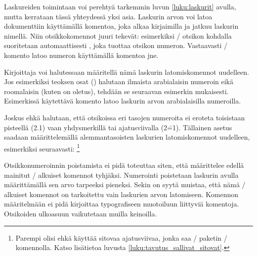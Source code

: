 Laskureiden toimintaan voi perehtyä tarkemmin luvun \ref{luku:laskurit}
avulla, mutta kerrataan tässä yhteydessä yksi asia. Laskurin arvon voi
latoa dokumenttiin käyttämällä komentoa, joka alkaa kirjaimilla
 ja jatkuu laskurin nimellä. Niin otsikkokomennot juuri
tekevät: esimerkiksi \-/ otsikon kohdalla suoritetaan
automaattisesti , joka tuottaa otsikon numeron.
Vastaavasti \-/ komento latoo numeron käyttämällä
komentoa  jne.

Kirjoittaja voi halutessaan määritellä nämä laskurin latomiskomennot
uudelleen. Jos esimerkiksi teoksen osat () halutaan
ilmaista arabialaisin numeroin eikä roomalaisin (kuten on oletus),
tehdään se seuraavan esimerkin mukaisesti. Esimerkissä käytettävä
komento  latoo laskurin arvon arabialaisilla numeroilla.

\begin{koodilohkosis}
\renewcommand{\thepart}{\arabic{part}}
\end{koodilohkosis}

Joskus ehkä halutaan, että otsikoissa eri tasojen numeroita ei eroteta
toisistaan pisteellä (2.1) vaan yhdysmerkillä tai ajatusviivalla
(2\==1). Tällainen asetus saadaan määrittelemällä alemmantasoisten
laskurien latomiskomennot uudelleen, esimerkiksi seuraavasti:%
\footnote{Parempi olisi ehkä käyttää sitovaa ajatusviivaa, jonka saa
  \-/ paketin \komento{==}\-/ komennolla. Katso
  lisätietoa luvusta \ref{luku:tavutus_sallivat_sitovat}.}

\begin{koodilohkosis}
\renewcommand{\thesubsection}{\thesection--\arabic{subsection}}
\renewcommand{\thesubsubsection}{%
  \thesubsection--\arabic{subsubsection}}
\end{koodilohkosis}

Otsikkonumeroinnin poistamista ei pidä toteuttaa siten, että määrittelee
edellä mainitut \-/ alkuiset komennot tyhjäksi. Numerointi
poistetaan laskurin  avulla määrittämällä sen arvo
tarpeeksi pieneksi. Sekin on syytä muistaa, että nämä \-/
alkuiset komennot on tarkoitettu vain laskurien arvon latomiseen.
Komennon määritelmään ei pidä kirjoittaa typografiseen muotoiluun
liittyviä komentoja. Otsikoiden ulkoasuun vaikutetaan muilla keinoilla.

